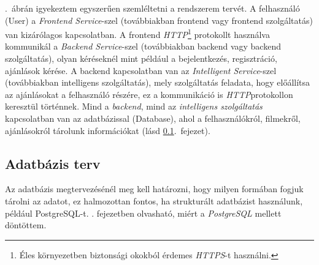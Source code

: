 \documentclass[
]{thesis-ekf}
\theoremstyle{definition}
\theoremstyle{remark}
\begin{document}
.~ábrán igyekeztem egyszerűen szemléltetni a rendszerem tervét. A felhasználó (User) a \emph{Frontend Service}-szel (továbbiakban frontend vagy frontend szolgáltatás) van kizárólagos kapcsolatban. A frontend \emph{HTTP}\footnote{Éles környezetben biztonsági okokból érdemes \emph{HTTPS}-t használni.} protokollt használva kommunikál a \emph{Backend Service}-szel (továbbiakban backend vagy backend szolgáltatás), olyan kéréseknél mint például a bejelentkezés, regisztráció, ajánlások kérése. A backend kapcsolatban van az \emph{Intelligent Service}-szel (továbbiakban intelligens szolgáltatás), mely szolgáltatás feladata, hogy előállítsa az ajánlásokat a felhasználó részére, ez a kommunikáció is \emph{HTTP}\footnotemark[\value{footnote}] protokollon keresztül történnek. Mind a \emph{backend}, mind az \emph{intelligens szolgáltatás} kapcsolatban van az adatbázissal (Database), ahol a felhasználókról, filmekről, ajánlásokról tárolunk információkat (lásd \ref{subsec-adatbazis-terv}.~fejezet).

\subsection{Adatbázis terv}
\label{subsec-adatbazis-terv}
Az adatbázis megtervezésénél meg kell határozni, hogy milyen formában fogjuk tárolni az adatot, ez halmozottan fontos, ha strukturált adatbázist használunk, például PostgreSQL-t. . fejezetben olvasható, miért a \emph{PostgreSQL} mellett döntöttem.
\end{document}
